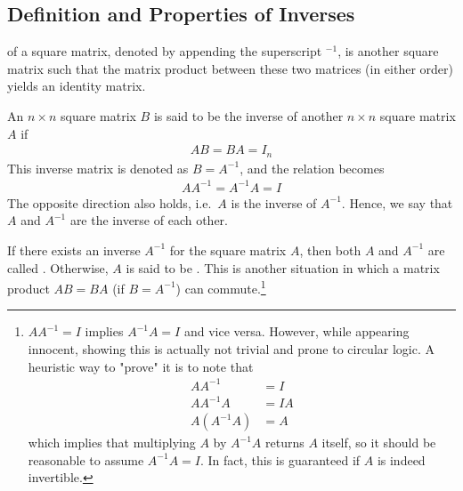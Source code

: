 \subsection{Definition and Properties of Inverses}
\label{subsection:invsub}
 of a square matrix, denoted by appending the superscript $^{-1}$, is another square matrix such that the matrix product between these two matrices (in either order) yields an identity matrix.
\begin{defn}[Inverse]
\label{defn:inverse}
An $n \times n$ square matrix $B$ is said to be the inverse of another $n \times n$ square matrix $A$ if 
\begin{align}
AB = BA = I_n    
\end{align}
This inverse matrix is denoted as $B = A^{-1}$, and the relation becomes 
\begin{align}
AA^{-1} = A^{-1}A = I    
\end{align}
The opposite direction also holds, i.e.\ $A$ is the inverse of $A^{-1}$. Hence, we say that $A$ and $A^{-1}$ are the inverse of each other.
\end{defn}
If there exists an inverse $A^{-1}$ for the square matrix $A$, then both $A$ and $A^{-1}$ are called . Otherwise, $A$ is said to be . This is another situation in which a matrix product $AB = BA$ (if $B=A^{-1}$) can commute.\footnote{$AA^{-1} = I$ implies $A^{-1}A = I$ and vice versa. However, while appearing innocent, showing this is actually not trivial and prone to circular logic. A heuristic way to "prove" it is to note that
\begin{align*}
AA^{-1} &= I \\
AA^{-1}A &= IA \\
A(A^{-1}A) &= A
\end{align*}
which implies that multiplying $A$ by $A^{-1}A$ returns $A$ itself, so it should be reasonable to assume $A^{-1}A = I$. In fact, this is guaranteed if $A$ is indeed invertible.}\par %
